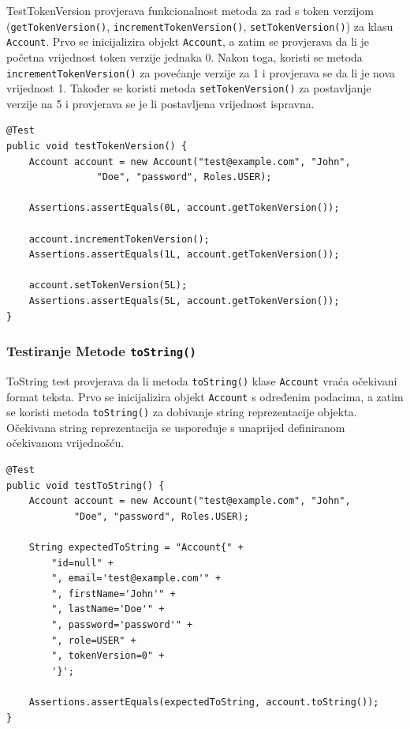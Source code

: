 			TestTokenVersion provjerava funkcionalnost metoda za rad s token verzijom \\(\texttt{getTokenVersion()}, \texttt{incrementTokenVersion()}, \texttt{setTokenVersion()}) za klasu \texttt{Account}. Prvo se inicijalizira objekt \texttt{Account}, a zatim se provjerava da li je početna vrijednost token verzije jednaka 0. Nakon toga, koristi se metoda \texttt{incrementTokenVersion()} za povećanje verzije za 1 i provjerava se da li je nova vrijednost 1. Također se koristi metoda \texttt{setTokenVersion()} za postavljanje verzije na 5 i provjerava se je li postavljena vrijednost ispravna.
			
			\begin{lstlisting}
@Test
public void testTokenVersion() {
	Account account = new Account("test@example.com", "John", 
				"Doe", "password", Roles.USER);
	
	Assertions.assertEquals(0L, account.getTokenVersion());
	
	account.incrementTokenVersion();
	Assertions.assertEquals(1L, account.getTokenVersion());
	
	account.setTokenVersion(5L);
	Assertions.assertEquals(5L, account.getTokenVersion());
}
			\end{lstlisting}
			
			\subsubsection{Testiranje Metode \texttt{toString()}}
			
			ToString test provjerava da li metoda \texttt{toString()} klase \texttt{Account} vraća očekivani format teksta. Prvo se inicijalizira objekt \texttt{Account} s određenim podacima, a zatim se koristi metoda \texttt{toString()} za dobivanje string reprezentacije objekta. Očekivana string reprezentacija se uspoređuje s unaprijed definiranom očekivanom vrijednošću.
			
			\begin{lstlisting}
@Test
public void testToString() {
	Account account = new Account("test@example.com", "John", 
			"Doe", "password", Roles.USER);
	
	String expectedToString = "Account{" +
		"id=null" +
		", email='test@example.com'" +
		", firstName='John'" +
		", lastName='Doe'" +
		", password='password'" +
		", role=USER" +
		", tokenVersion=0" +
		'}';
	
	Assertions.assertEquals(expectedToString, account.toString());
}
			\end{lstlisting}
			
